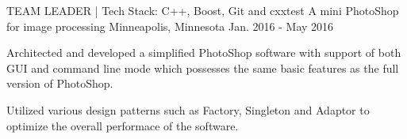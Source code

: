 \begin{cventries}
  \cventry
    {TEAM LEADER \enskip | \enskip Tech Stack: C++, Boost, Git and cxxtest} %
    {A mini PhotoShop for image processing} %
    {Minneapolis, Minnesota} %
    {Jan. 2016 - May 2016} %
    {
      \begin{cvitems} %
        \item {Architected and developed a simplified PhotoShop software with support of both GUI and command line mode which possesses the same basic features as the full version of PhotoShop.}
        \item {Utilized various design patterns such as Factory, Singleton and Adaptor to optimize the overall performace of the software.}
      \end{cvitems}
    }

\end{cventries}
